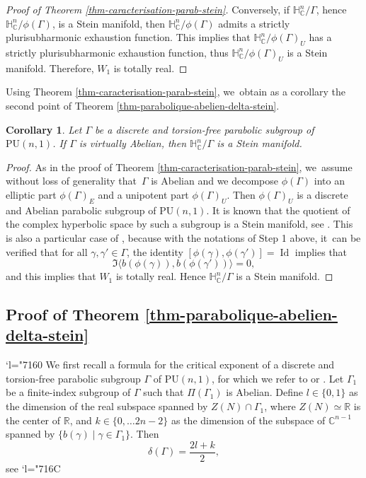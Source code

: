 \documentclass[JEP,XML,SOM,Unicode,NoEqCountersInSection,published]{cedram}
\newcommand{\Changel}{\mathcode`l="7160}
\newcommand{\Changelback}{\mathcode`l="716C}
\newtheorem{corollary}[theorem]{Corollary}
\theoremstyle{definition}
\newcommand{\C}{\mathbb{C}}
\newcommand{\R}{\mathbb{R}}
\newcommand{\HNC}{\mathbb{H}^{n}_{\C}}
\newcommand{\PU}{\mathrm{PU}}
\DeclareMathOperator{\Id}{Id}
\def\C{\mathbb{C}}
\newcommand{\HNC}{\mathbb{H}^{n}_{\C}}
\newcommand{\PU}{\mathrm{PU}}
\begin{document}
\begin{proof}[Proof of Theorem \ref{thm-caracterisation-parab-stein}]
Conversely, if $\HNC/\Gamma$, hence $\HNC/\phi(\Gamma)$, is a Stein manifold, then $\HNC/\phi(\Gamma)$ admits a strictly plurisubharmonic exhaustion function. This implies that $\HNC/\phi(\Gamma)_U$ has a strictly plurisubharmonic exhaustion function, thus $\HNC/\phi(\Gamma)_U$ is a Stein manifold. Therefore, $W_1$ is totally real.
\end{proof}

Using Theorem \ref{thm-caracterisation-parab-stein}, we~obtain as a corollary the second point of Theorem \ref{thm-parabolique-abelien-delta-stein}.

\begin{corollary}\label{cor-virt-ab-stein}
Let $\Gamma$ be a discrete and torsion-free parabolic subgroup of $\PU(n,1)$. If $\Gamma$ is virtually Abelian, then $\HNC/\Gamma$ is a Stein manifold.
\end{corollary}

\begin{proof}
As in the proof of Theorem \ref{thm-caracterisation-parab-stein}, we~assume without loss of generality that~$\Gamma$ is Abelian and we decompose $\phi(\Gamma)$ into an elliptic part $\phi(\Gamma)_E$ and a unipotent part $\phi(\Gamma)_U$. Then $\phi(\Gamma)_U$ is a discrete and Abelian parabolic subgroup of $\PU(n,1)$. It is known that the quotient of the complex hyperbolic space by such a subgroup is a Stein manifold, see \cite{chenDiscreteGroupsHolomorphic2013}. This is also a particular case of \cite[Th.\,1.4]{miebachQuotientsBoundedHomogeneous2024}, because with the notations of Step 1 above, it~can be verified that for all $\gamma,\gamma'\in \Gamma$, the identity $[\phi(\gamma),\phi(\gamma')]=\Id$ implies that
\begin{equation*}
\Im\langle b(\phi(\gamma)),b(\phi(\gamma'))\rangle = 0,
\end{equation*}
and this implies that $W_1$ is totally real. Hence $\HNC/\Gamma$ is a Stein manifold.
\end{proof}
\subsection{Proof of Theorem \ref{thm-parabolique-abelien-delta-stein}}
\Changel
We first recall a formula for the critical exponent of a discrete and torsion-free parabolic subgroup $\Gamma$ of $\PU(n,1)$, for which we refer to \cite{corletteLimitSetsDiscrete1999} or \cite[\S3]{dalboSeriesPoincareGroupes2000}. Let $\Gamma_1$ be a finite-index subgroup of $\Gamma$ such that $\Pi(\Gamma_1)$ is Abelian. Define $l\in\{0,1\}$ as the dimension of the real subspace spanned by $Z(N)\cap \Gamma_1$, where $Z(N)\simeq\R$ is the center of $\R$, and $k\in\{0,\dots 2n-2\}$ as the dimension of the subspace of $\C^{n-1}$ spanned by $\{b(\gamma) \mid \gamma \in \Gamma_1\}$. Then\begin{equation}\label{eq-delta-parab}
\delta(\Gamma) = \frac{2l+k}{2},
\end{equation}
see \cite[Proof of Lem.\,3.5]{corletteLimitSetsDiscrete1999}
\Changelback
\end{document}
